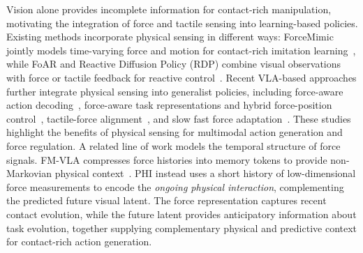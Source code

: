 \documentclass{article} %
\begin{document}
Vision alone provides incomplete information for contact-rich manipulation,
motivating the integration of force and tactile sensing into learning-based
policies. Existing methods incorporate physical sensing in different ways:
ForceMimic jointly models time-varying force and motion for contact-rich
imitation learning~\cite{liu2025forcemimic}, while FoAR and Reactive
Diffusion Policy (RDP) combine visual observations with force or tactile
feedback for reactive control~\cite{he2024foar,xue2025rdp}. Recent VLA-based
approaches further integrate physical sensing into generalist policies,
including force-aware action decoding~\cite{yu2025forcevla}, force-aware task
representations and hybrid force-position control~\cite{li2026forcevla2},
tactile-force alignment~\cite{huang2026tafvla}, and slow fast force
adaptation~\cite{li2026favla}. These studies highlight the benefits of
physical sensing for multimodal action generation and force regulation. A related line of work models the temporal structure of force signals.
FM-VLA compresses force histories into memory tokens to provide
non-Markovian physical context~\cite{li2026fmvla}. PHI instead uses a short
history of low-dimensional force measurements to encode the \emph{ongoing
physical interaction}, complementing the predicted future visual latent.
The force representation captures recent contact evolution, while the
future latent provides anticipatory information about task evolution,
together supplying complementary physical and predictive context for
contact-rich action generation.



\end{document}

